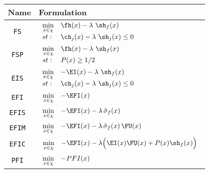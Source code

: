 \begin{center}
\begin{tabular}{| c | l | }
  \hline %
  Name & Formulation 
  \\\hline\hline %
  {\tt FS } &	$\begin{array}{l l}
		  \min\limits_{x \in \chi} &  \fh(x) - \lambda~\sh_f(x) \\
		  st:                      &  \ch_j(x) - \lambda~\sh_j(x) \le 0
	  \end{array}$
  \\\hline  %
  {\tt FSP } &	$\begin{array}{l l}
		  \min\limits_{x \in \chi} &  \fh(x) - \lambda~\sh_f(x) \\
		  st:                      &  P(x) \ge 1/2
	  \end{array} $
  \\\hline%
  {\tt EIS } & $\begin{array}{l l}
		  \min\limits_{x \in \chi} &  -\EI(x) - \lambda~\sh_f(x) \\
		  st:                      &  \ch_j(x) - \lambda~\sh_j(x) \le 0
	  \end{array} $
  \\\hline%
  {\tt EFI } & $
		  \begin{array}{l l}
			  \min\limits_{x \in \chi} & -\EFI(x)
		  \end{array} 
	  $
  \\\hline%
  {\tt EFIS } & $
		  \begin{array}{l l}
			  \min\limits_{x \in \chi} & -\EFI(x)-\lambda\,\hat{\sigma}_f(x)
		  \end{array} 
	  $
  \\\hline%
  {\tt EFIM } & 	$
		  \begin{array}{l l}
			  \min\limits_{x \in \chi} & -\EFI(x)-\lambda\,\hat{\sigma}_f(x)\,\FU(x)
		  \end{array} 
	  $
  \\\hline%
  {\tt EFIC } & $
		  \begin{array}{l l}
			  \min\limits_{x \in \chi} & -\EFI(x) - \lambda \Big(  \EI(x)\FU(x) + P(x)\sh_f(x)       \Big)   
		  \end{array} 
	  $
  \\\hline%
  {\tt PFI } & $
	    \begin{array}{l l}
		    \min\limits_{x \in \chi} & -PFI(x)
	    \end{array} 
    $
  \\\hline %
\end{tabular}
\end{center}


